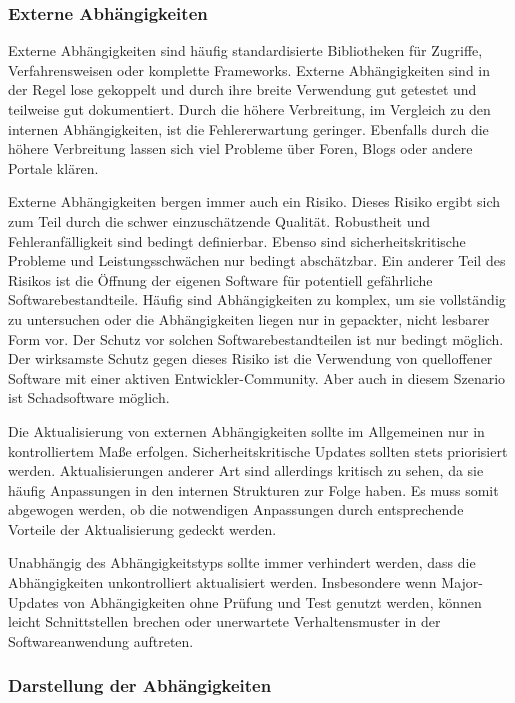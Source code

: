 \subsubsection{Externe Abhängigkeiten}

Externe Abhängigkeiten sind häufig standardisierte Bibliotheken für Zugriffe, Verfahrensweisen oder komplette Frameworks. Externe Abhängigkeiten sind in der Regel lose gekoppelt und durch ihre breite Verwendung gut getestet und teilweise gut dokumentiert. Durch die höhere Verbreitung, im Vergleich zu den internen Abhängigkeiten, ist die Fehlererwartung geringer. Ebenfalls durch die höhere Verbreitung lassen sich viel Probleme über Foren, Blogs oder andere Portale klären.

Externe Abhängigkeiten bergen immer auch ein Risiko. Dieses Risiko ergibt sich zum Teil durch die schwer einzuschätzende Qualität. Robustheit und Fehleranfälligkeit sind bedingt definierbar. Ebenso sind sicherheitskritische Probleme und Leistungsschwächen nur bedingt abschätzbar. Ein anderer Teil des Risikos ist die Öffnung der eigenen Software für potentiell gefährliche Softwarebestandteile. Häufig sind Abhängigkeiten zu komplex, um sie vollständig zu untersuchen oder die Abhängigkeiten liegen nur in gepackter, nicht lesbarer Form vor. Der Schutz vor solchen Softwarebestandteilen ist nur bedingt möglich. Der wirksamste Schutz gegen dieses Risiko ist die Verwendung von quelloffener Software mit einer aktiven Entwickler-Community. Aber auch in diesem Szenario ist Schadsoftware möglich.

Die Aktualisierung von externen Abhängigkeiten sollte im Allgemeinen nur in kontrolliertem Maße erfolgen. Sicherheitskritische Updates sollten stets priorisiert werden. Aktualisierungen anderer Art sind allerdings kritisch zu sehen, da sie häufig Anpassungen in den internen Strukturen zur Folge haben. Es muss somit abgewogen werden, ob die notwendigen Anpassungen durch entsprechende Vorteile der Aktualisierung gedeckt werden.

Unabhängig des Abhängigkeitstyps sollte immer verhindert werden, dass die Abhängigkeiten unkontrolliert aktualisiert werden. Insbesondere wenn Major-Updates von Abhängigkeiten ohne Prüfung und Test genutzt werden, können leicht Schnittstellen brechen oder unerwartete Verhaltensmuster in der Softwareanwendung auftreten.

\subsubsection{Darstellung der Abhängigkeiten}
\label{subsubsec:illustrate-dependencies}

